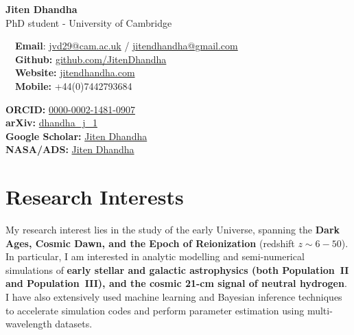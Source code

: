 \documentclass{article}
\begin{document}
\small %


\begin{center}
\huge
\textbf{Jiten Dhandha} \\
\normalsize
PhD student - University of Cambridge \\
\end{center}

\begin{minipage}[ht]{0.6\linewidth}
	\faEnvelope~~\textbf{Email}: \href{mailto:jvd29@cam.ac.uk}{jvd29@cam.ac.uk} / \href{mailto:jitendhandha@gmail.com}{jitendhandha@gmail.com} \\
	\faGithub~~\textbf{Github:} \href{https://github.com/JitenDhandha}{github.com/JitenDhandha}\\
	\faGlobe~~\textbf{Website:} \href{https://jitendhandha.com}{jitendhandha.com} \\
  \faPhone~~\textbf{Mobile:} +44(0)7442793684 \\
\end{minipage}
\begin{minipage}[ht]{0.34\linewidth}
	\begin{flushright}
    \textbf{ORCID:} \href{https://orcid.org/0000-0002-1481-0907}{0000-0002-1481-0907} \\
    \textbf{arXiv:} \href{https://arxiv.org/a/dhandha_j_1.html}{dhandha\_j\_1} \\
    \textbf{Google Scholar:} \href{https://scholar.google.com/citations?user=RjlmcA0AAAAJ}{Jiten Dhandha} \\
    \textbf{NASA/ADS:} \href{https://ui.adsabs.harvard.edu/search/?q=author%3A%22Dhandha%2C+Jiten%22}{Jiten Dhandha} \\
	\end{flushright}
\end{minipage}

\section*{Research Interests}

My research interest lies in the study of the early Universe, spanning the \textbf{Dark Ages, Cosmic Dawn, and the Epoch of Reionization} (redshift $z\sim 6 - 50$). In particular, I am interested in analytic modelling and semi-numerical simulations of \textbf{early stellar and galactic astrophysics (both Population~II and Population~III), and the cosmic 21-cm signal of neutral hydrogen}. I have also extensively used machine learning and Bayesian inference techniques to accelerate simulation codes and perform parameter estimation using multi-wavelength datasets.
\end{document}
